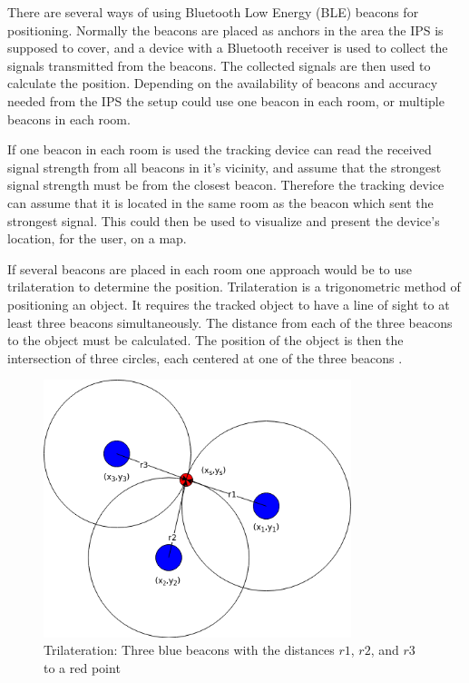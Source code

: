 \documentclass[../Main/thesis.tex]{subfiles}
\begin{document}
There are several ways of using Bluetooth Low Energy (BLE) beacons for positioning.
Normally the beacons are placed as anchors in the area the IPS is supposed to cover, and a device with a Bluetooth receiver is used to collect the signals transmitted from the beacons.
The collected signals are then used to calculate the position.
Depending on the availability of beacons and accuracy needed from the IPS the setup could use one beacon in each room, or multiple beacons in each room.

If one beacon in each room is used the tracking device can read the received signal strength from all beacons in it's vicinity, and assume that the strongest signal strength must be from the closest beacon.
Therefore the tracking device can assume that it is located in the same room as the beacon which sent the strongest signal.
This could then be used to visualize and present the device's location, for the user, on a map.

If several beacons are placed in each room one approach would be to use trilateration to determine the position.
Trilateration is a trigonometric method of positioning an object.
It requires the tracked object to have a line of sight to at least three beacons simultaneously.
The distance from each of the three beacons to the object must be calculated.
The position of the object is then the intersection of three circles, each centered at one of the three beacons \citep{Chawathe}.

\begin{figure}[h]
	\centering
	\includegraphics[width=0.8\textwidth]{../fig/Trilaterering}
	\caption{Trilateration: Three blue beacons with the distances $r1$, $r2$, and $r3$ to a red point}
	\label{fig:trilateration}
\end{figure}
\end{document}
